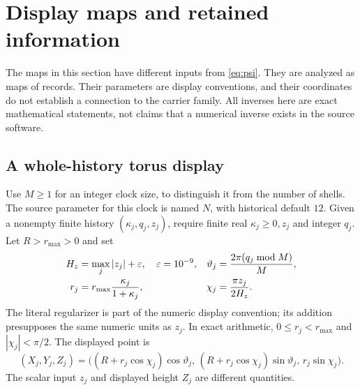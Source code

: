 \documentclass[11pt,a4paper]{article}
\theoremstyle{definition}
\theoremstyle{remark}
\begin{document}
\section{Display maps and retained information}
\label{sec:displays}
The maps in this section have different inputs from
\eqref{eq:psi}. They are analyzed as maps of records. Their
parameters are display conventions, and their coordinates
do not establish a connection to the carrier family.
All inverses here are exact mathematical statements, not
claims that a numerical inverse exists in the source software.

\subsection{A whole-history torus display}
Use $M\geq1$ for an integer clock size, to distinguish it from
the number of shells. The source parameter for this clock is
named $N$, with historical default $12$.
Given a nonempty finite history
$(\kappa_j,q_j,z_j)$, require finite real $\kappa_j\geq0,z_j$
and integer $q_j$. Let $R>r_{\max}>0$ and set
\begin{align}
 H_z&=\max_j|z_j|+\varepsilon,\quad \varepsilon=10^{-9},&
 \vartheta_j&=\frac{2\pi(q_j\bmod M)}M,\notag\\
 r_j&=r_{\max}\frac{\kappa_j}{1+\kappa_j},&
 \chi_j&=\frac{\pi z_j}{2H_z}. \label{eq:historyparams}
\end{align}
The literal regularizer is part of the numeric display convention;
its addition presupposes the same numeric units as $z_j$.
In exact arithmetic, $0\leq r_j<r_{\max}$ and
$|\chi_j|<\pi/2$. The displayed point is
\begin{equation}
 (X_j,Y_j,Z_j)=
 \bigl((R+r_j\cos\chi_j)\cos\vartheta_j,\,
       (R+r_j\cos\chi_j)\sin\vartheta_j,\,
        r_j\sin\chi_j\bigr).
 \label{eq:history}
\end{equation}
The scalar input $z_j$ and displayed height $Z_j$ are different
quantities.
\end{document}
